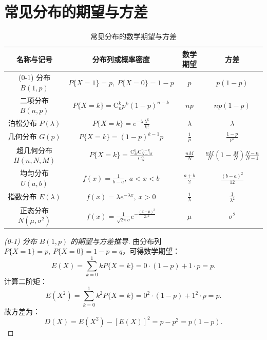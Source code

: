 ﻿\documentclass[lang=cn,11pt]{elegantbook}
\begin{document}
\section{常见分布的期望与方差}

\begin{table}[h]
\centering
\caption{常见分布的数学期望与方差} \label{tab:dist-expect-var}
\begin{tabular}{c|c|c|c}
\toprule
名称与记号 & 分布列或概率密度 & 数学期望 & 方差 \\
\midrule
(0-1) 分布 $B(1,p)$ & $P\{X=1\}=p,\ P\{X=0\}=1-p$ & $p$ & $p(1-p)$ \\
二项分布 $B(n,p)$ & $P\{X=k\}=\mathrm{C}_n^k p^k (1-p)^{n-k}$ & $np$ & $np(1-p)$ \\
泊松分布 $P(\lambda)$ & $P\{X=k\}=e^{-\lambda}\frac{\lambda^k}{k!}$ & $\lambda$ & $\lambda$ \\
几何分布 $G(p)$ & $P\{X=k\}=(1-p)^{k-1}p$ & $\frac{1}{p}$ & $\frac{1-p}{p^2}$ \\
超几何分布 $H(n,N,M)$ & $P\{X=k\}=\frac{\mathrm{C}_M^k \mathrm{C}_{N-M}^{n-k}}{\mathrm{C}_N^n}$ & $\frac{nM}{N}$ & $\frac{nM}{N}\left(1-\frac{M}{N}\right)\frac{N-n}{N-1}$ \\
均匀分布 $U(a,b)$ & $f(x)=\frac{1}{b-a},\ a < x < b$ & $\frac{a+b}{2}$ & $\frac{(b-a)^2}{12}$ \\
指数分布 $E(\lambda)$ & $f(x)=\lambda e^{-\lambda x},\ x > 0$ & $\frac{1}{\lambda}$ & $\frac{1}{\lambda^2}$ \\
正态分布 $N(\mu,\sigma^2)$ & $f(x)=\frac{1}{\sqrt{2\pi}\sigma}e^{-\frac{(x-\mu)^2}{2\sigma^2}}$ & $\mu$ & $\sigma^2$ \\
\bottomrule
\end{tabular}
\end{table}

\begin{proof}[(0-1) 分布 $B(1,p)$ 的期望与方差推导]
由分布列 $P\{X=1\}=p,\ P\{X=0\}=1-p=q$，可得数学期望：
\[
E(X) = \sum_{k=0}^1 k P\{X=k\} = 0 \cdot (1-p) + 1 \cdot p = p.
\]
计算二阶矩：
\[
E(X^2) = \sum_{k=0}^1 k^2 P\{X=k\} = 0^2 \cdot (1-p) + 1^2 \cdot p = p.
\]
故方差为：
\[
D(X) = E(X^2) - [E(X)]^2 = p - p^2 = p(1-p).
\]
\end{proof}
\end{document}
